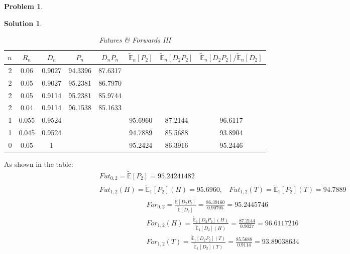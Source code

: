 \documentclass[a4paper, 10pt]{article}
\renewcommand{\arraystretch}{1.4}
\theoremstyle{definition}
\newtheorem{problem}{Problem}
\theoremstyle{hSol}
\newtheorem*{solution}{Solution}
\begin{document}
\begin{problem} 
\end{problem}
\begin{solution} 

\begin{table}[h]
\vspace{-1pt}
\caption{\textit{Futures \& Forwards III}}
\vspace{-7pt}
\centering
\def\arraystretch{1.15}
\begin{tabular}{|r|ccccccc|}
\hline
$n$ & $R_n$ & $D_{n}$ & $P_n$ & $D_{n}P_n$ & $\tilde{\mathbb{E}}_{n}\left[P_2\right]$ & $\tilde{\mathbb{E}}_{n}\left[D_2P_2\right]$ & $\tilde{\mathbb{E}}_{n}\left[D_2P_2\right]/ \tilde{\mathbb{E}}_n\left[D_2\right]$\\ 
\hline
2 & 0.06 & 0.9027 & 94.3396 & 87.6317&&&\\
2 & 0.05 & 0.9027 & 95.2381 & 86.7970&&&\\
2 & 0.05 & 0.9114 & 95.2381 & 85.9744&&&\\
2 & 0.04 & 0.9114 & 96.1538 & 85.1633&&&\\
\hline
1 & 0.055 & 0.9524 & && 95.6960 & 87.2144 & 96.6117\\
1 & 0.045 & 0.9524 & && 94.7889 & 85.5688 & 93.8904\\
\hline
0 & 0.05 & 1 & && 95.2424 & 86.3916 & 95.2446\\
\hline
\end{tabular}
\label{tab:ff3}
\end{table}

As shown in the table:
\begin{equation}
  \begin{split}
    &Fut_{0,2} = \tilde{\mathbb{E}}\left[P_2\right] = 95.24241482\\
    &Fut_{1,2}(H) = \tilde{\mathbb{E}}_1\left[P_2\right](H) = 95.6960,~~~~Fut_{1,2}(T) = \tilde{\mathbb{E}}_1\left[P_2\right](T) = 94.7889
  \end{split}
\end{equation}
\begin{equation}
  \begin{split}
    &For_{0,2} = \frac{\tilde{\mathbb{E}}\left[D_2P_2\right]}{\tilde{\mathbb{E}}\left[D_2\right]} = \frac{86.39160}{0.90705} = 95.2445746\\
    &For_{1,2}(H) = \frac{\tilde{\mathbb{E}}_1\left[D_2P_2\right](H)}{\tilde{\mathbb{E}}_1\left[D_2\right](H)} = \frac{87.2144}{0.9027} = 96.6117216\\
    &For_{1,2}(T) = \frac{\tilde{\mathbb{E}}_1\left[D_2P_2\right](T)}{\tilde{\mathbb{E}}_1\left[D_2\right](T)} = \frac{85.5688}{0.9114} = 93.89038634
  \end{split}
\end{equation}

\end{solution}
\end{document}
